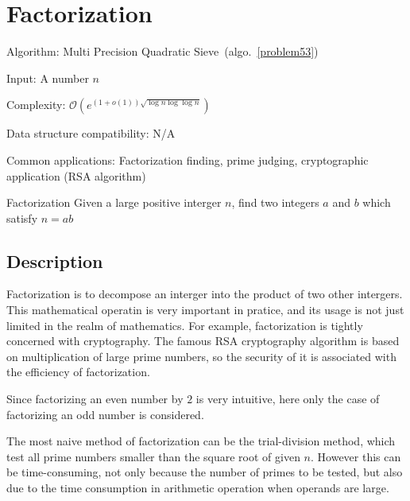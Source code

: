 \documentclass{article}
\begin{document}
\fi

%
%

\def\pbname{Factorization} %

\section{\pbname} 

\begin{overview}
\item [Algorithm:] Multi Precision Quadratic Sieve~(algo.~\ref{problem53})
\item [Input:] A number $n$
\item [Complexity:] $\mathcal{O}(e^{(1+o(1))\sqrt{\log{n}\log{\log{n}}}})$
\item [Data structure compatibility:] N/A
\item [Common applications:] Factorization finding, prime judging, cryptographic application (RSA algorithm)
\end{overview}



\begin{problem}{\pbname}
	Given a large positive interger $n$, find two integers $a$ and $b$ which satisfy $n=ab$ 
\end{problem}

\subsection*{Description}

Factorization is to decompose an interger into the product of two other intergers. This mathematical operatin is very important in pratice, and its usage is not just limited in the realm of mathematics. For example, factorization is tightly concerned with cryptography. The famous RSA cryptography algorithm is based on multiplication of large prime numbers, so the security of it is associated with the efficiency of factorization. 

Since factorizing an even number by $2$ is very intuitive, here only the case of factorizing an odd number is considered. 

The most naive method of factorization can be the trial-division method, which test all prime numbers smaller than the square root of given $n$. However this can be time-consuming, not only because the number of primes to be tested, but also due to the time consumption in arithmetic operation when operands are large.
\end{document}
